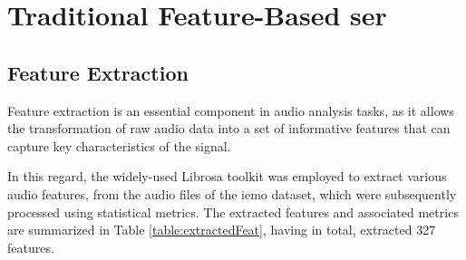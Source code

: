 \section{Traditional Feature-Based \ac{ser}}


\subsection{Feature Extraction}

Feature extraction is an essential component in audio analysis tasks, as it allows the transformation of raw audio data into a set of informative features that can capture key characteristics of the signal.

In this regard, the widely-used Librosa toolkit was employed to extract various audio features, from the audio files of the \ac{iemo} dataset, which were subsequently processed using statistical metrics. The extracted features and associated metrics are summarized in Table \ref{table:extractedFeat}, having in total, extracted 327 features.

